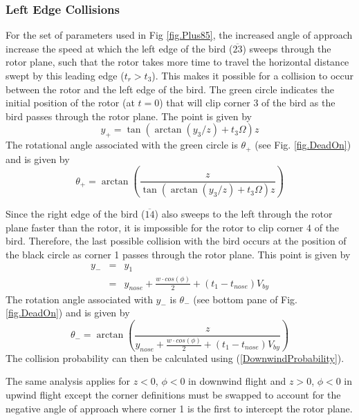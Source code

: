 \documentclass[10pt,conference]{IEEEtran}
\begin{document}
\subsubsection{Left Edge Collisions} For the set of parameters used in Fig \ref{fig.Plus85}, the increased angle of
approach increase the speed at which the left edge of the bird ($\overline{23}$) sweeps through the rotor plane, such
that the rotor takes more time to travel the horizontal distance swept by this leading edge ($t_r>t_3$). This makes it
possible for a collision to occur between the rotor and the left edge of the bird. The green circle indicates the
initial position of the rotor (at $t=0$) that will clip corner 3 of the bird as the bird passes through the rotor
plane. The point is given by
\begin{equation}
    y_+ = \tan(\arctan(y_3/z)+t_3\Omega)z
\end{equation}
The rotational angle associated with the green circle is $\theta_+$ (see Fig. \ref{fig.DeadOn}) and is given by
\begin{equation}
    \theta_+ = \arctan\left(\frac{z}{\tan(\arctan(y_3/z)+t_3\Omega)z}\right)
\end{equation}

Since the right edge of the bird ($\overline{14}$) also sweeps to the left through the rotor plane faster than the
rotor, it is impossible for the rotor to clip corner 4 of the bird. Therefore, the last possible collision with the
bird occurs at the position of the black circle as corner 1 passes through the rotor plane. This point is given by
\begin{eqnarray}
    \nonumber y_- &=& y_1\\
    &=& y_{nose}+\frac{w \cdot cos(\phi)}{2}+(t_1-t_{nose})V_{by}
\end{eqnarray}
The rotation angle associated with $y_-$ is $\theta_-$ (see bottom pane of Fig. \ref{fig.DeadOn}) and is given by
\begin{equation}
    \theta_- = \arctan \left(\frac{z}{y_{nose}+\frac{w \cdot cos(\phi)}{2}+(t_1-t_{nose})V_{by}}\right)
\end{equation}
The collision probability can then be calculated using (\ref{DownwindProbability}).

The same analysis applies for $z<0$, $\phi<0$ in downwind flight and $z>0$, $\phi<0$ in upwind flight except the corner
definitions must be swapped to account for the negative angle of approach where corner 1 is the first to intercept the
rotor plane.
\end{document}
